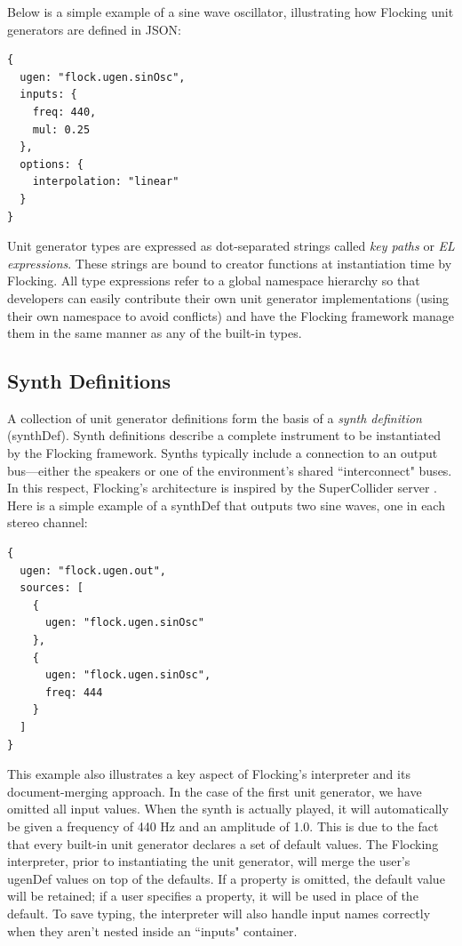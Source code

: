 \documentclass{article}
\begin{document}
Below is a simple example of a sine wave oscillator, illustrating how Flocking unit generators are defined in JSON:

\begin{verbatim}
{
  ugen: "flock.ugen.sinOsc",
  inputs: {
    freq: 440,
    mul: 0.25
  },
  options: {
    interpolation: "linear"
  }
}
\end{verbatim}

Unit generator types are expressed as dot-separated strings called {\it key paths} or {\it EL expressions}. These strings are bound to creator functions at instantiation time by Flocking. All type expressions refer to a global namespace hierarchy so that developers can easily contribute their own unit generator implementations (using their own namespace to avoid conflicts) and have the Flocking framework manage them in the same manner as any of the built-in types.

\subsection{Synth Definitions}

A collection of unit generator definitions form the basis of a {\it synth definition} (synthDef). Synth definitions describe a complete instrument to be instantiated by the Flocking framework. Synths typically include a connection to an output bus---either the speakers or one of the environment's shared ``interconnect" buses. In this respect, Flocking's architecture is inspired by the SuperCollider server \cite[pp.25]{wilson2011supercollider}. Here is a simple example of a synthDef that outputs two sine waves, one in each stereo channel:

\begin{verbatim}
{
  ugen: "flock.ugen.out",
  sources: [
    {
      ugen: "flock.ugen.sinOsc"
    },
    {
      ugen: "flock.ugen.sinOsc",
      freq: 444
    }
  ]
}
\end{verbatim}

This example also illustrates a key aspect of Flocking's interpreter and its document-merging approach. In the case of the first unit generator, we have omitted all input values. When the synth is actually played, it will automatically be given a frequency of 440 Hz and an amplitude of 1.0. This is due to the fact that every built-in unit generator declares a set of default values. The Flocking interpreter, prior to instantiating the unit generator, will merge the user's ugenDef values on top of the defaults. If a property is omitted, the default value will be retained; if a user specifies a property, it will be used in place of the default. To save typing, the interpreter will also handle input names correctly when they aren't nested inside an ``inputs" container.
\end{document}
